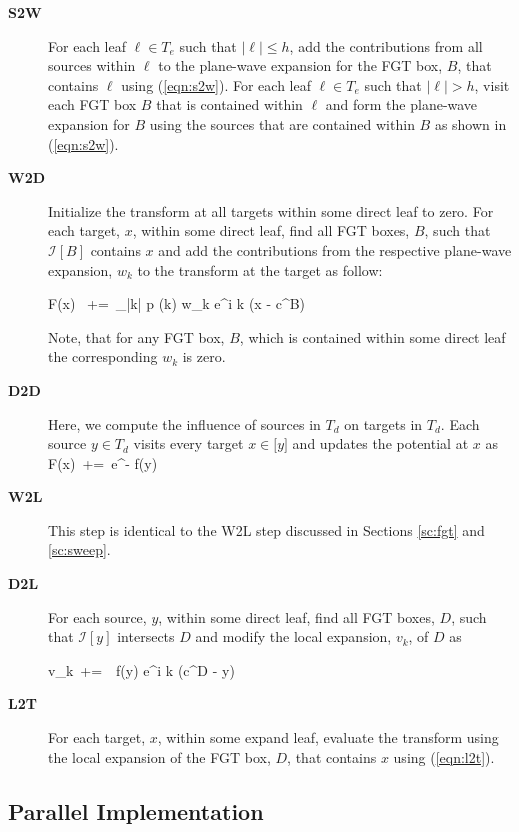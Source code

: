 \begin{description}
\item[\textbf{S2W}] For each leaf $\ell \in T_e$ such that $|\ell| \leq h$, add the contributions from all sources within $\ell$
to the plane-wave expansion for the FGT box, $B$, that contains $\ell$ using (\ref{eqn:s2w}). For each leaf $\ell \in T_e$ such that $|\ell| > h$,
visit each FGT box $B$ that is contained within $\ell$ and form the plane-wave expansion for $B$ using the sources that are contained within $B$
as shown in (\ref{eqn:s2w}).

\item[\textbf{W2D}] Initialize the transform at all targets within some direct leaf to zero. For
 each target, $x$, within some direct leaf, find all FGT boxes, $B$, such that $\mathcal{I}[B]$ contains $x$ and
 add the contributions from the respective plane-wave expansion, $w_k$ to the transform at the target as follow: 

\beq F(x) \, +=\, \sum_{|k| \leq p} (k)  w_k e^{i \lambda k \cdot (x - c^B)} \label{eqn:w2d} \eeq

Note, that for any FGT box, $B$, which is contained within some direct leaf the corresponding $w_k$ is zero.

\item[\textbf{D2D}] Here, we compute the influence of sources in $T_d$ on targets in $T_d$. Each source $y \in T_d$ visits 
every target $x \in \mathcal[y]$ and updates the potential at $x$ as 
%  
\beq F(x) \,+=\, e^{-} f(y) \label{eqn:d2d} \eeq
%

\item[\textbf{W2L}] This step is identical to the W2L step discussed in Sections \ref{sc:fgt} and \ref{sc:sweep}.

\item[\textbf{D2L}] For each source, $y$, within some direct leaf, find all FGT boxes, $D$, such that $\mathcal{I}[y]$ intersects $D$ and
modify the local expansion, $v_k$, of $D$ as 

\beq v_k  \,+=\, \, f(y) e^{i \lambda k \cdot (c^D - y)} \label{eqn:d2l} \eeq

\item[\textbf{L2T}] For each target, $x$, within some expand leaf, evaluate the transform using the local 
expansion of the FGT box, $D$, that contains $x$ using (\ref{eqn:l2t}).

\end{description}


\subsection{Parallel Implementation}
\label{sc:parallelnufgt}

